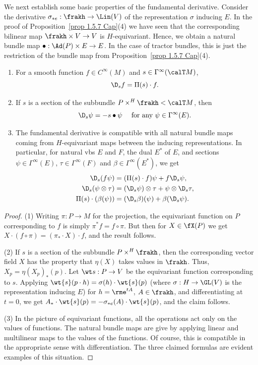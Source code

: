 We next establish some basic properties of the fundamental derivative. Consider the derivative $\sigma_{\ast e}:\frakh\to \Lin(V)$ of the representation $\sigma$ inducing $E$. In the proof of Proposition~\ref{prop 1.5.7 Cap}(4) we have seen that the corresponding bilinear map $\frakh\times V\to V$ is $H$-equivariant. Hence, we obtain a natural bundle map $\bullet:\Ad(P)\times E\to E$. In the case of tractor bundles, this is just the restriction of the bundle map from Proposition~\ref{prop 1.5.7 Cap}(4).

\begin{prop}\label{prop 1.5.8 Cap}
    \begin{enumerate}[label=(\arabic*)]
        \item For a smooth function $f\in C^\infty(M)$ and $s\in \Gamma^\infty(\calT M)$, 
        \[\D_s f=\Pi(s)\cdot f.\]
        \item If $s$ is a section of the subbundle $P\times^H\frakh<\calT M$, then 
        \[\D_s \psi=-s\bullet\psi\quad \text{ for any }\psi\in \Gamma^\infty(E).\]
        \item The fundamental derivative is compatible with all natural bundle maps coming from $H$-equivariant maps between the inducing representations. In particular, for natural \glspl{vb} $E$ and $F$, the dual $E^\ast$ of $E$, and sections $\psi\in\Gamma^\infty(E)$, $\tau\in\Gamma^\infty(F)$ and $\beta\in\Gamma^\infty(E^\ast)$, we get 
        \begin{align}
            \D_s(f\psi)&=(\Pi(s)\cdot f)\psi+f\D_s\psi,\\
            \D_s(\psi\otimes\tau)&=(\D_s \psi)\otimes\tau +\psi\otimes\D_s\tau,\\
            \Pi(s)\cdot(\beta(\psi))&=(\D_s\beta)(\psi)+\beta(\D_s\psi).
        \end{align}
    \end{enumerate}
\end{prop}
\begin{proof}
    (1) Writing $\pi:P\to M$ for the projection, the equivariant function on $P$ corresponding to $f$ is simply $\pi^\ast f=f\circ \pi$. But then for $X\in\fX(P)$ we get $X\cdot (f\circ \pi)=(\pi_\ast\cdot X)\cdot f$, and the result follows.

    (2) If $s$ is a section of the subbundle $P\times^H\frakh$, then the corresponding vector field $X$ has the property that $\eta(X)$ takes values in $\frakh$. Thus, $X_p=\eta(X_p)_\ast(p)$. Let $\wt s:P\to V$ be the equivariant function corresponding to $s$. Applying $\wt{s}(p\cdot h)=\sigma(h)\cdot \wt{s}(p)$ (where $\sigma:H\to \GL(V)$ is the representation inducing $E$) for $h=\rme^{tA}$, $A\in\frakh$, and differentiating at $t=0$, we get $A_\ast\cdot \wt{s}(p)=-\sigma_{\ast e}(A)\cdot \wt{s}(p)$, and the claim follows. 

    (3) In the picture of equivariant functions, all the operations act only on the values of functions. The natural bundle maps  are give by applying linear and multilinear maps to the values of the functions. Of course, this is compatible in the appropriate sense with differentiation. The three claimed formulas are evident examples of this situation.
\end{proof}


